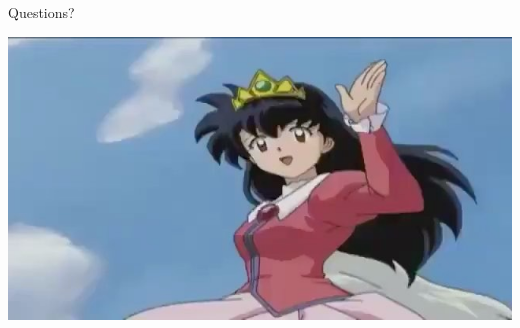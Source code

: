 \documentclass{beamer}
\begin{document}
\begin{frame}{Questions?}
	\begin{center}
		\includegraphics[scale=.35]{end.jpg}
	\end{center}
\end{frame}
\end{document}
